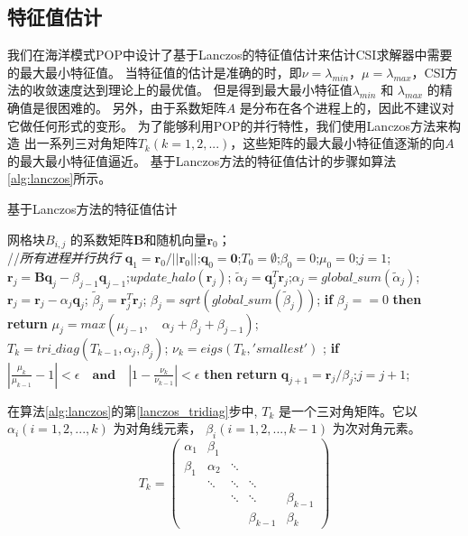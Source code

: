 \subsection{特征值估计}
\label{solver:eigs}
我们在海洋模式POP中设计了基于Lanczos的特征值估计来估计CSI求解器中需要的最大最小特征值。
当特征值的估计是准确的时，即$\nu = \lambda_{min}$，$\mu =\lambda_{max}$，CSI方法的收敛速度达到理论上的最优值。 
但是得到最大最小特征值$\lambda_{min}$ 和 $\lambda_{max}$ 的精确值是很困难的。
另外，由于系数矩阵$A$ 是分布在各个进程上的，因此不建议对它做任何形式的变形。  
为了能够利用POP的并行特性，我们使用Lanczos方法来构造 出一系列三对角矩阵$T_k(k=1,2,...)$，这些矩阵的最大最小特征值逐渐的向$A$的最大最小特征值逼近。
基于Lanczos方法的特征值估计的步骤如算法\ref{alg:lanczos}所示。 
\begin{algorithm}
\caption{ 基于Lanczos方法的特征值估计}
\label{alg:lanczos}
\begin{algorithmic}[1]
\REQUIRE  网格块$B_{i,j}$ 的系数矩阵$\textbf{B}$和随机向量$\textbf{r}_0$；\\
 //\qquad    \textit{所有进程并行执行}
\STATE $\textbf{q}_1 = \textbf{r}_0/||\textbf{r}_0||$;\quad $\textbf{q}_0=\textbf{0}$;\quad $T_0=\emptyset$;\quad $\beta_0 =0$;\quad  $\mu_0 =0$;\quad $j=1$;
\STATE $\textbf{r}_j=\textbf{B}\textbf{q}_j-\beta_{j-1}\textbf{q}_{j-1}$;\quad $update\_halo(\textbf{r}_j)$;
\STATE $\tilde{\alpha}_j =\textbf{q}_j^T\textbf{r}_j$;\quad $\alpha_j=global\_sum(\tilde{\alpha}_j)$; 
\STATE $\textbf{r}_j=\textbf{r}_j-\alpha_{j}\textbf{q}_{j}$;
\STATE $\tilde{\beta}_j = \textbf{r}_j^T\textbf{r}_j$; \quad $\beta_j=sqrt(global\_sum(\tilde{\beta}_j))$;
\STATE \textbf{if} $\beta_j == 0$ \textbf{then} \textbf{return}
\STATE $\mu_j = max(\mu_{j-1}, \quad \alpha_j+\beta_j+\beta_{j-1})$; \label{lanczos_gersh} \\
\STATE $T_k=tri\_diag(T_{k-1},\alpha_j,\beta_j)$; \quad $\nu_k = eigs(T_k,'smallest')$ ; \label{lanczos_tridiag} 
\STATE \textbf{if} $|\frac{\mu_k}{\mu_{k-1}} -1 |< \epsilon\quad\textbf{and}\quad|1- \frac{\nu_k}{\nu_{k-1}}|< \epsilon$ \textbf{then} \textbf{return}
\STATE $\textbf{q}_{j+1}= \textbf{r}_j/\beta_j$;\quad $j=j+1$;
\ENDWHILE
\end{algorithmic}
\end{algorithm}
 
在算法\ref{alg:lanczos}的第\ref{lanczos_tridiag}步中, $T_k$ 是一个三对角矩阵。它以 $\alpha_i (i=1,2,...,k)$ 为对角线元素， $\beta_i (i=1,2,...,k-1)$ 为次对角元素。 
\[ T_{k} = \left(\begin{array}{ccccc}
\alpha_1 & \beta_1  &  &&  \\
\beta_1 & \alpha_2  & \ddots &&  \\
  & \ddots & \ddots & \ddots&  \\
  &    &\ddots  &\ddots& \beta_{k-1} \\
 &    &  &\beta_{k-1}& \beta_{k} 
\end{array} \right)\]

